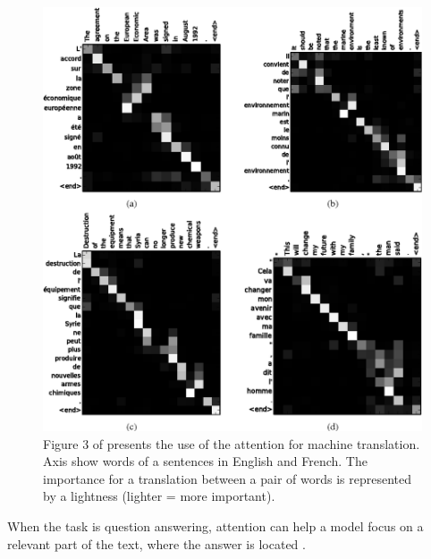 \begin{center}
\begin{figure}[!h]
\includegraphics[width=1\columnwidth]{../img/attention_translate}
\caption[Attention for machine translation]{Figure 3 of \citep{Bahdanau} presents the use of the attention for machine translation. Axis show words of a sentences in English and French. The importance for a translation between a pair of words is represented by a lightness (lighter = more important).
}
\label{pic:att_trans}
\end{figure}
\end{center}
When the task is question answering, attention can help a model focus on a relevant part of the text, where the answer is located \citep{Santos2016}.


